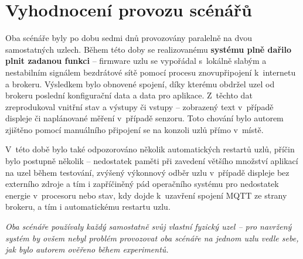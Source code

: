 \section{Vyhodnocení provozu scénářů}\label{sec:vyhodnocení}

Oba scénáře byly po dobu sedmi dnů provozovány paralelně na dvou samostatných uzlech.
Během této doby se realizovanému \textbf{systému plně dařilo plnit zadanou funkci} -- firmware uzlu se vypořádal
s~lokálně slabým a nestabilním signálem bezdrátové sítě pomocí procesu znovupřipojení k~internetu a brokeru.
Výsledkem bylo obnovené spojení, díky kterému obdržel uzel od brokeru poslední konfigurační data a data pro
aplikace.
Z~těchto dat zreprodukoval vnitřní stav a výstupy či vstupy -- zobrazený text v~případě displeje či naplánované měření
v~případě senzoru.
Toto chování bylo autorem zjištěno pomocí manuálního připojení se na konzoli uzlů přímo v~místě.

V~této době bylo také odpozorováno několik automatických restartů uzlů, příčin bylo postupně několik -- nedostatek
paměti při zavedení většího množství aplikací na uzel během testování, zvýšený výkonnový odběr uzlu v~případě
displeje bez externího zdroje a tím i zapříčiněný pád operačního systému pro nedostatek energie v~procesoru nebo
stav, kdy dojde k~uzavření spojení MQTT ze strany brokeru, a tím i automatickému restartu uzlu.

\textit{Oba scénáře používaly každý samostatně svůj vlastní fyzický uzel -- pro navržený systém by ovšem nebyl
problém provozovat oba scénáře na jednom uzlu vedle sebe, jak bylo autorem ověřeno během experimentů.}